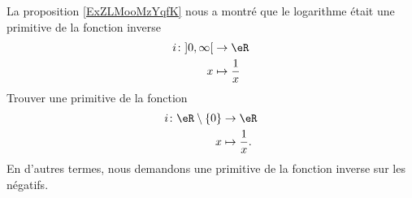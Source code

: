 
\begin{exercice}\label{exoanalyseCTU-0002}

    La proposition \ref{ExZLMooMzYqfK} nous a montré que le logarithme était une primitive de la fonction inverse
    \begin{equation}
        \begin{aligned}
        i\colon \mathopen] 0 , \infty \mathclose[&\to \eR \\
            x&\mapsto \frac{1}{ x } 
        \end{aligned}
    \end{equation}
    Trouver une primitive de la fonction
    \begin{equation}
        \begin{aligned}
            i\colon \eR\setminus\{ 0 \}&\to \eR \\
            x&\mapsto \frac{1}{ x } .
        \end{aligned}
    \end{equation}
    En d'autres termes, nous demandons une primitive de la fonction inverse sur les négatifs.

\end{exercice}
